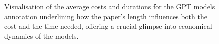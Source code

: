 \begin{figure}[htpb]
  \centering
  \quad 
  \caption[Cost Analysis]{Visualisation of the average costs and durations for the GPT models annotation underlining how the paper's length influences both the cost and the time needed, offering a crucial glimpse into economical dynamics of the models.}\label{fig:gpt-cost-anal}
\end{figure}

